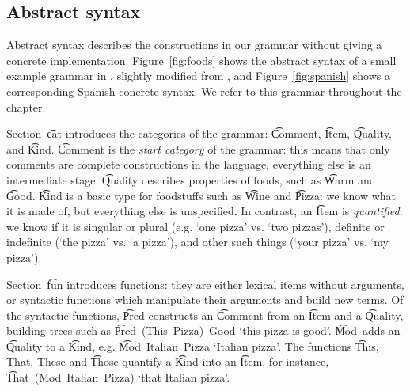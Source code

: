 \subsection{Abstract syntax}


Abstract syntax describes the constructions in our grammar without
giving a concrete implementation. Figure~\ref{fig:foods}
shows the abstract syntax of a small example grammar in \gf{}, slightly
modified from \cite{ranta2011gfbook}, and Figure~\ref{fig:spanish}
shows a corresponding Spanish concrete syntax. We refer to this
grammar throughout the chapter. 

Section~\t{cat} introduces the categories of the grammar: \t{Comment},
\t{Item},  \t{Quality}, and \t{Kind}.  \t{Comment} is the \emph{start
  category} of the grammar: this means that only comments are complete
constructions in the language, everything else is an intermediate
stage. \t{Quality} describes properties of foods, such as
\t{Warm} and \t{Good}. %
\t{Kind} is a basic type for foodstuffs such as \t{Wine} and
\t{Pizza}: we know what it is made of, but everything else is
unspecified. In contrast, an \t{Item} is \emph{quantified}: we know if
it is singular or plural (e.g. `one pizza' vs. `two pizzas'), definite or
indefinite (`the pizza' vs. `a pizza'), and other such things (`your
pizza' vs. `my pizza'). 

Section~\t{fun} introduces functions: they are either lexical
items without arguments, or syntactic functions which manipulate their
arguments and build new terms. Of the syntactic functions, \t{Pred}
constructs an \t{Comment} from an \t{Item} and a \t{Quality},
building trees such as \t{Pred~(This~Pizza)~Good} `this pizza is
good'. 
\t{Mod}~adds an \t{Quality} to a \t{Kind}, e.g. \t{Mod~Italian~Pizza}
`Italian pizza'. The functions  \t{This, That, These} 
and \t{Those} quantify a \t{Kind} into an \t{Item}, for instance,
\t{That~(Mod~Italian~Pizza)} `that Italian pizza'.

